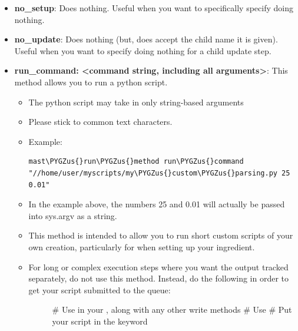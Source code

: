 \documentclass[letterpaper,10pt,english]{sphinxmanual}
\def\PYGZus{\char`\_}
\begin{document}
\begin{itemize}
\item {} 
\textbf{no\_setup}: Does nothing. Useful when you want to specifically specify doing nothing.

\item {} 
\textbf{no\_update}: Does nothing (but, does accept the child name it is given). Useful when you want to specify doing nothing for a child update step.

\item {} 
\textbf{run\_command: \textless{}command string, including all arguments\textgreater{}}: This method allows you to run a python script.
\begin{itemize}
\item {} 
The python script may take in only string-based arguments

\item {} 
Please stick to common text characters.

\item {} 
Example:

\begin{Verbatim}[commandchars=\\\{\}]
mast\PYGZus{}run\PYGZus{}method run\PYGZus{}command "//home/user/myscripts/my\PYGZus{}custom\PYGZus{}parsing.py 25 0.01"
\end{Verbatim}

\item {} 
In the example above, the numbers 25 and 0.01 will actually be passed into sys.argv as a string.

\item {} 
This method is intended to allow you to run short custom scripts of your own creation, particularly for  when setting up your ingredient.

\item {} \begin{description}
\item[{For long or complex execution steps where you want the output tracked separately, do not use this method. Instead, do the following in order to get your script submitted to the queue:}] \leavevmode
\#  Use  in your , along with any other write methods
\#  Use 
\#  Put your script in the  keyword

\end{description}

\end{itemize}

\end{itemize}
\end{document}

